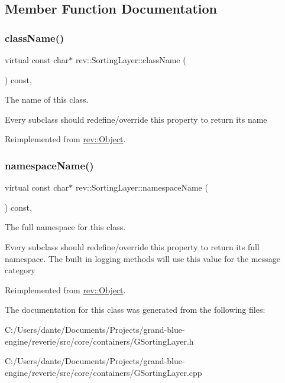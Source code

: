 \subsection{Member Function Documentation}
\mbox{\label{structrev_1_1_sorting_layer_a40a55ae51e2a1e38aeb01eea9acc9bfb}} 
\subsubsection{\texorpdfstring{className()}{className()}}
{\footnotesize\ttfamily virtual const char$\ast$ rev\+::\+Sorting\+Layer\+::class\+Name (\begin{DoxyParamCaption}{ }\end{DoxyParamCaption}) const\hspace{0.3cm}{\ttfamily [inline]}, {\ttfamily [virtual]}}



The name of this class. 

Every subclass should redefine/override this property to return its name 

Reimplemented from \mbox{\hyperlink{classrev_1_1_object_a7a2013f91169479b65cf93afdc5d9a68}{rev\+::\+Object}}.

\mbox{\label{structrev_1_1_sorting_layer_a5923e5133aac7e650a6b4e711d5883d1}} 
\subsubsection{\texorpdfstring{namespaceName()}{namespaceName()}}
{\footnotesize\ttfamily virtual const char$\ast$ rev\+::\+Sorting\+Layer\+::namespace\+Name (\begin{DoxyParamCaption}{ }\end{DoxyParamCaption}) const\hspace{0.3cm}{\ttfamily [inline]}, {\ttfamily [virtual]}}



The full namespace for this class. 

Every subclass should redefine/override this property to return its full namespace. The built in logging methods will use this value for the message category 

Reimplemented from \mbox{\hyperlink{classrev_1_1_object_aaeb638d3e10f361c56c211a318a27f3d}{rev\+::\+Object}}.



The documentation for this class was generated from the following files\+:\begin{DoxyCompactItemize}
\item 
C\+:/\+Users/dante/\+Documents/\+Projects/grand-\/blue-\/engine/reverie/src/core/containers/G\+Sorting\+Layer.\+h\item 
C\+:/\+Users/dante/\+Documents/\+Projects/grand-\/blue-\/engine/reverie/src/core/containers/G\+Sorting\+Layer.\+cpp\end{DoxyCompactItemize}
